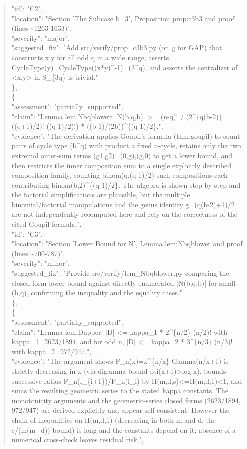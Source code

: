 \documentclass[11pt]{article}
\begin{document}
\begin{quote}
      "id": "C2",\\
      "location": "Section 'The Subcase b=3', Proposition prop:c3b3 and proof (lines \~{}1263-1633)",\\
      "severity": "major",\\
      "suggested\_fix": "Add src/verify/prop\_c3b3.py (or .g for GAP) that constructs x,y for all odd q in a wide range, asserts CycleType(y)=CycleType((x*y)\^{}-1)=(3\^{}q), and asserts the centralizer of <x,y> in S\_\{3q\} is trivial."\\
    \},\\
    \{\\
      "assessment": "partially\_supported",\\
      "claim": "Lemma lem:Nbqblower: |N(b,q,b)| >= (n-q)! / (2\^{}\{q(b-2)\} ((q+1)/2)! ((q-1)/2)!) * ((b-1)/(2b))\^{}\{(q-1)/2\}.",\\
      "evidence": "The derivation applies Goupil's formula (thm:goupil) to count pairs of cycle type (b\^{}q) with product a fixed n-cycle, retains only the two extremal outer-sum terms (g1,g2)=(0,g),(g,0) to get a lower bound, and then restricts the inner composition sum to a single explicitly described composition family, counting binom(q,(q-1)/2) such compositions each contributing binom(b,2)\^{}\{(q-1)/2\}. The algebra is shown step by step and the factorial simplifications are plausible, but the multiple binomial/factorial manipulations and the genus identity g=(q(b-2)+1)/2 are not independently recomputed here and rely on the correctness of the cited Goupil formula.",\\
      "id": "C3",\\
      "location": "Section 'Lower Bound for N', Lemma lem:Nbqblower and proof (lines \~{}700-787)",\\
      "severity": "minor",\\
      "suggested\_fix": "Provide src/verify/lem\_Nbqblower.py comparing the closed-form lower bound against directly enumerated |N(b,q,b)| for small (b,q), confirming the inequality and the equality cases."\\
    \},\\
    \{\\
      "assessment": "partially\_supported",\\
      "claim": "Lemma lem:Dupper: |D| <= kappa\_1 * 2\^{}\{n/2\} (n/2)! with kappa\_1=2623/1894, and for odd n, |D| <= kappa\_2 * 3\^{}\{n/3\} (n/3)! with kappa\_2=972/947.",\\
      "evidence": "The argument shows F\_n(x)=x\^{}\{n/x\} Gamma(n/x+1) is strictly decreasing in x (via digamma bound psi(x+1)>log x), bounds successive ratios F\_n(l\_\{i+1\})/F\_n(l\_i) by H(m,d,s)<=H(m,d,1)<1, and sums the resulting geometric series to the stated kappa constants. The monotonicity arguments and the geometric-series closed forms (2623/1894, 972/947) are derived explicitly and appear self-consistent. However the chain of inequalities on H(m,d,1) (decreasing in both m and d, the e/(m(m+d)) bound) is long and the constants depend on it; absence of a numerical cross-check leaves residual risk.",\\

\end{quote}
\end{document}
